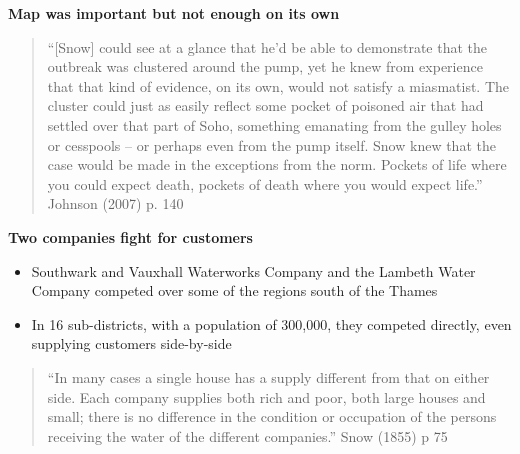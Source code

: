 \documentclass[notes=show]{beamer}
\begin{document}
\begin{frame}[plain]
\begin{center}
\textbf{Map was important but not enough on its own}
\end{center}

\begin{quote}
``[Snow] could see at a glance that he'd be able to demonstrate that the outbreak was clustered
around the pump, yet he knew from experience that that kind of evidence, on its own, would
not satisfy a miasmatist. The cluster could just as easily reflect some pocket of poisoned air that
had settled over that part of Soho, something emanating from the gulley holes or cesspools -- or
perhaps even from the pump itself. Snow knew that the case would be made in the exceptions
from the norm. Pockets of life where you could expect death, pockets of death where you would
expect life.'' Johnson (2007) p. 140
\end{quote}

\end{frame}

\begin{frame}[plain]
\begin{center}
\textbf{Two companies fight for customers}
\end{center}

\begin{itemize}
\item Southwark and Vauxhall Waterworks Company and the Lambeth Water Company competed over some of the regions south of the Thames
\item In 16 sub-districts, with a population of 300,000, they competed directly, even supplying customers side-by-side
\end{itemize}

\begin{quote}
``In many cases a single house has a supply different from that on either side. Each company
supplies both rich and poor, both large houses and small; there is no difference in the condition
or occupation of the persons receiving the water of the different companies.'' Snow (1855) p 75
\end{quote}

\end{frame}
\end{document}

